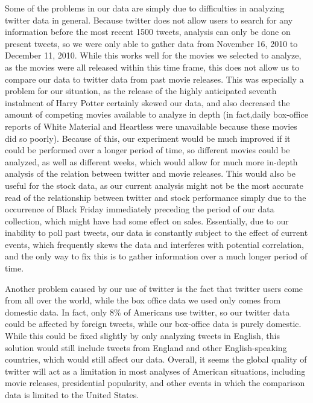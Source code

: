 \documentclass[11pt]{article}
\begin{document}
Some of the problems in our data are simply due to difficulties in analyzing twitter data in general.  Because twitter does not allow users to search for any information before the most recent 1500 tweets, analysis can only be done on present tweets, so we were only able to gather data from November 16, 2010 to December 11, 2010.  While this works well for the movies we selected to analyze, as the movies were all released within this time frame, this does not allow us to compare our data to twitter data from past movie releases.  This was especially a problem for our situation, as the release of the highly anticipated seventh instalment of Harry Potter certainly skewed our data, and also decreased the amount of competing movies available to analyze in depth (in fact,daily box-office reports of White Material and Heartless were unavailable because these movies did so poorly).  Because of this, our experiment would be much improved if it could be performed over a longer period of time, so different movies could be analyzed, as well as different weeks, which would allow for much more in-depth analysis of the relation between twitter and movie releases.  This would also be useful for the stock data, as our current analysis might not be the most accurate read of the relationship between twitter and stock performance simply due to the occurrence of Black Friday immediately preceding the period of our data collection, which might have had some effect on sales. Essentially, due to our inability to poll past tweets, our data is constantly subject to the effect of current events, which frequently skews the data and interferes with potential correlation, and the only way to fix this is to gather information over a much longer period of time.

Another problem caused by our use of twitter is the fact that twitter users come from all over the world, while the box office data we used only comes from domestic data.  In fact, only 8\% of Americans use twitter, so our twitter data could be affected by foreign tweets, while our box-office data is purely domestic.  While this could be fixed slightly by only analyzing tweets in English, this solution would still include tweets from England and other English-speaking countries, which would still affect our data.  Overall, it seems the global quality of twitter will act as a limitation in most analyses of American situations, including movie releases, presidential popularity, and other events in which the comparison data is limited to the United States.
	
\end{document}
